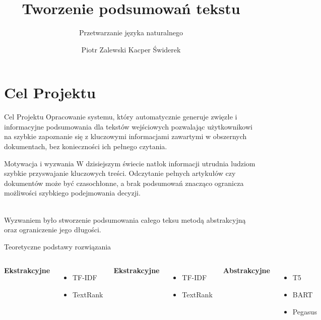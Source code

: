 \documentclass[aspectratio=169,xcolor=dvipsnames]{beamer}
\title{Tworzenie podsumowań tekstu}
\subtitle{Przetwarzanie języka naturalnego}
\author{Piotr Zalewski Kacper Świderek}
\begin{document}
\begin{frame}
    \titlepage
\end{frame}

\section{Cel Projektu}

\begin{frame}{Cel Projektu}
    Opracowanie systemu, który automatycznie generuje zwięzłe i informacyjne
podsumowania dla tekstów wejściowych pozwalając użytkownikowi na szybkie
zapoznanie się z kluczowymi informacjami zawartymi w obszernych dokumentach,
bez konieczności ich pełnego czytania.
\end{frame}


\begin{frame}{Motywacja i wyzwania}
    W dzisiejszym świecie natłok informacji utrudnia ludziom szybkie przyswajanie
kluczowych treści. Odczytanie pełnych artykułów czy dokumentów może być
czasochłonne, a brak podsumowań znacząco ogranicza możliwości szybkiego
podejmowania decyzji.\\~

Wyzwaniem było stworzenie podsumowania całego teksu metodą abstrakcyjną oraz
 ograniczenie jego długości.
\end{frame}


\begin{frame}{Teoretyczne podstawy rozwiązania}
    \begin{columns}[c] %

        \textbf{Ekstrakcyjne}
        \begin{itemize}
            \item TF-IDF
            \item TextRank \\~
        \end{itemize}

        \textbf{Ekstrakcyjne}
        \begin{itemize}
            \item TF-IDF
            \item TextRank
        \end{itemize}

        \textbf{Abstrakcyjne}
        \begin{itemize}
            \item T5
            \item BART
            \item Pegasus
        \end{itemize}
    \end{columns}
\end{frame}
\end{document}
